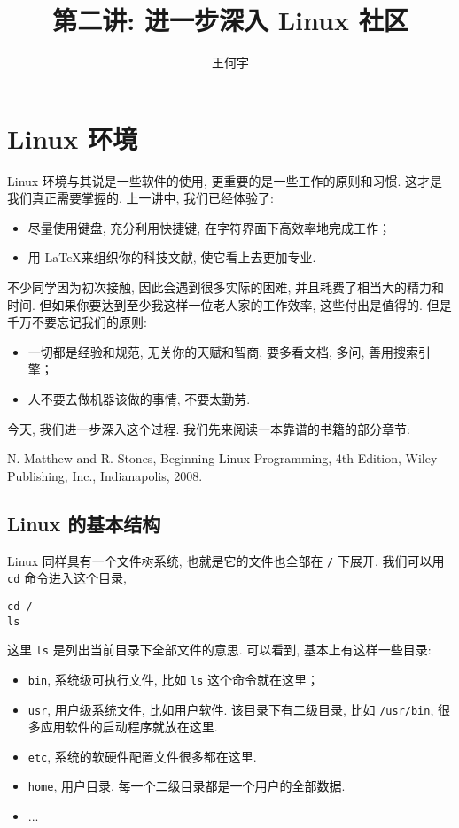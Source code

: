 \documentclass[a4paper]{ctexart}
\title{第二讲: 进一步深入 Linux 社区}
\author{王何宇}
\date{}
\begin{document}
\maketitle
\pagestyle{empty}

\section{Linux 环境}

Linux 环境与其说是一些软件的使用, 更重要的是一些工作的原则和习惯. 这才是我们真正需要掌握的.
上一讲中, 我们已经体验了\cite{Galdi2011An}:

\begin{itemize}
\item 尽量使用键盘, 充分利用快捷键, 在字符界面下高效率地完成工作；
\item 用 \LaTeX 来组织你的科技文献, 使它看上去更加专业.  
\end{itemize}

不少同学因为初次接触, 因此会遇到很多实际的困难, 并且耗费了相当大的精力和时间.
但如果你要达到至少我这样一位老人家的工作效率, 这些付出是值得的. 但是千万不要忘记我们的原则:

\begin{itemize}
\item 一切都是经验和规范, 无关你的天赋和智商, 要多看文档, 多问, 善用搜索引擎；
\item 人不要去做机器该做的事情, 不要太勤劳.
\end{itemize}

今天, 我们进一步深入这个过程. 我们先来阅读一本靠谱的书籍的部分章节\cite{zhoudx2020universality}:

N. Matthew and R. Stones, Beginning Linux Programming,
4th Edition, Wiley Publishing, Inc.,
Indianapolis, 2008.

\subsection{Linux 的基本结构}

Linux 同样具有一个文件树系统, 也就是它的文件也全部在 \verb|/| 下展开. 我们可以用 \verb|cd| 命令进入这个目录,
\begin{verbatim}
cd /
ls
\end{verbatim}

这里 \verb|ls| 是列出当前目录下全部文件的意思. 可以看到, 基本上有这样一些目录:

\begin{itemize}
\item \verb|bin|, 系统级可执行文件, 比如 \verb|ls| 这个命令就在这里；
\item \verb|usr|, 用户级系统文件, 比如用户软件. 该目录下有二级目录, 比如 \verb|/usr/bin|,
  很多应用软件的启动程序就放在这里.
\item \verb|etc|, 系统的软硬件配置文件很多都在这里.
\item \verb|home|, 用户目录, 每一个二级目录都是一个用户的全部数据. 
\item ...
\end{itemize}
\end{document}
